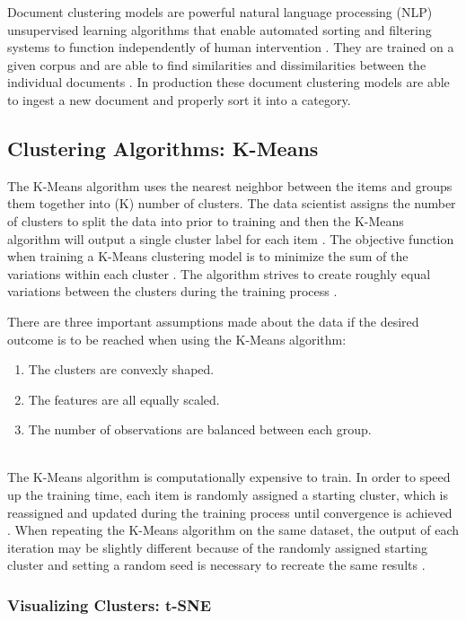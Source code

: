 \documentclass[5p,authoryear]{elsarticle}
\begin{document}
Document clustering models are powerful natural language processing (NLP) unsupervised learning algorithms that enable automated sorting and filtering systems to function independently of human intervention \citep{Cookbook}. 
They are trained on a given corpus and are able to find similarities and dissimilarities between the individual documents \citep{handsOn}.
In production these document clustering models are able to ingest a new document and properly sort it into a category.


\subsection{Clustering Algorithms: K-Means}\label{kmeans}

The K-Means algorithm uses the nearest neighbor between the items and groups them together into (K) number of clusters.
The data scientist assigns the number of clusters to split the data into prior to training and then the K-Means algorithm will output a single cluster label for each item \citep{handsOn}.
The objective function when training a K-Means clustering model is to minimize the sum of the variations within each cluster \citep{handsOn}.
The algorithm strives to create roughly equal variations between the clusters during the training process \citep{Cookbook}.


There are three important assumptions made about the data if the desired outcome is to be reached when using the K-Means algorithm: 
\begin{enumerate}
 \item The clusters are convexly shaped.
 \item The features are all equally scaled.
 \item The number of observations are balanced between each group. 
\end{enumerate} \\

The K-Means algorithm is computationally expensive to train.
In order to speed up the training time, each item is randomly assigned a starting cluster, which is reassigned and updated during the training process until convergence is achieved \citep{handsOn}. 
When repeating the K-Means algorithm on the same dataset, the output of each iteration may be slightly different because of the randomly assigned starting cluster and setting a random seed is necessary to recreate the same results \citep{handsOn}. 


\subsubsection{Visualizing Clusters: t-SNE}\label{kmeans}
\end{document}
